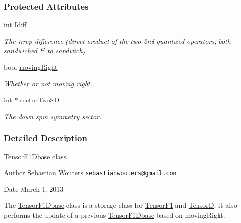 \subsubsection*{Protected Attributes}
\begin{DoxyCompactItemize}
\item 
\hypertarget{classCheMPS2_1_1TensorF1Dbase_a430364e4d4ea139632b6da244745bac6}{int \hyperlink{classCheMPS2_1_1TensorF1Dbase_a430364e4d4ea139632b6da244745bac6}{Idiff}}\label{classCheMPS2_1_1TensorF1Dbase_a430364e4d4ea139632b6da244745bac6}

\begin{DoxyCompactList}\small\item\em The irrep difference (direct product of the two 2nd quantized operators; both sandwiched \& to sandwich) \end{DoxyCompactList}\item 
\hypertarget{classCheMPS2_1_1TensorF1Dbase_a9999ca33b85ec3b26feac2b16e020d65}{bool \hyperlink{classCheMPS2_1_1TensorF1Dbase_a9999ca33b85ec3b26feac2b16e020d65}{moving\-Right}}\label{classCheMPS2_1_1TensorF1Dbase_a9999ca33b85ec3b26feac2b16e020d65}

\begin{DoxyCompactList}\small\item\em Whether or not moving right. \end{DoxyCompactList}\item 
\hypertarget{classCheMPS2_1_1TensorF1Dbase_abdf75089cbe8bf9ef27bb36a4aa70b0c}{int $\ast$ \hyperlink{classCheMPS2_1_1TensorF1Dbase_abdf75089cbe8bf9ef27bb36a4aa70b0c}{sector\-Two\-S\-D}}\label{classCheMPS2_1_1TensorF1Dbase_abdf75089cbe8bf9ef27bb36a4aa70b0c}

\begin{DoxyCompactList}\small\item\em The down spin symmetry sector. \end{DoxyCompactList}\end{DoxyCompactItemize}


\subsubsection{Detailed Description}
\hyperlink{classCheMPS2_1_1TensorF1Dbase}{Tensor\-F1\-Dbase} class. \begin{DoxyAuthor}{Author}
Sebastian Wouters \href{mailto:sebastianwouters@gmail.com}{\tt sebastianwouters@gmail.\-com} 
\end{DoxyAuthor}
\begin{DoxyDate}{Date}
March 1, 2013
\end{DoxyDate}
The \hyperlink{classCheMPS2_1_1TensorF1Dbase}{Tensor\-F1\-Dbase} class is a storage class for \hyperlink{classCheMPS2_1_1TensorF1}{Tensor\-F1} and \hyperlink{classCheMPS2_1_1TensorD}{Tensor\-D}. It also performs the update of a previous \hyperlink{classCheMPS2_1_1TensorF1Dbase}{Tensor\-F1\-Dbase} based on moving\-Right. 

